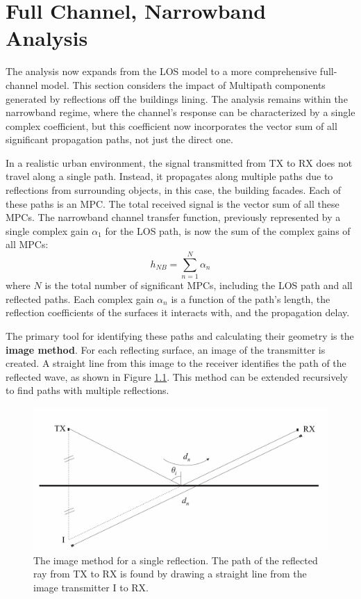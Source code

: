 \chapter{Full Channel, Narrowband Analysis}
\label{chap:full_narrow}

The analysis now expands from the LOS model to a more comprehensive full-channel model. This section considers the impact of Multipath components generated by reflections off the buildings lining. The analysis remains within the narrowband regime, where the channel's response can be characterized by a single complex coefficient, but this coefficient now incorporates the vector sum of all significant propagation paths, not just the direct one.


In a realistic urban environment, the signal transmitted from TX to RX does not travel along a single path. Instead, it propagates along multiple paths due to reflections from surrounding objects, in this case, the building facades. Each of these paths is an MPC. The total received signal is the vector sum of all these MPCs. The narrowband channel transfer function, previously represented by a single complex gain $\alpha_1$ for the LOS path, is now the sum of the complex gains of all MPCs:
\begin{equation}
	h_{NB} = \sum_{n=1}^{N} \alpha_n
\end{equation}
where $N$ is the total number of significant MPCs, including the LOS path and all reflected paths. Each complex gain $\alpha_n$ is a function of the path's length, the reflection coefficients of the surfaces it interacts with, and the propagation delay.

The primary tool for identifying these paths and calculating their geometry is the \textbf{image method}. For each reflecting surface, an image of the transmitter is created. A straight line from this image to the receiver identifies the path of the reflected wave, as shown in Figure \ref{fig:image_method_single}. This method can be extended recursively to find paths with multiple reflections.

\begin{figure}[h!]
	\centering
	\includegraphics[width=0.7\linewidth]{content/4-images/image-method.png}
	\caption{The image method for a single reflection. The path of the reflected ray from TX to RX is found by drawing a straight line from the image transmitter I to RX.}
	\label{fig:image_method_single}
\end{figure}


